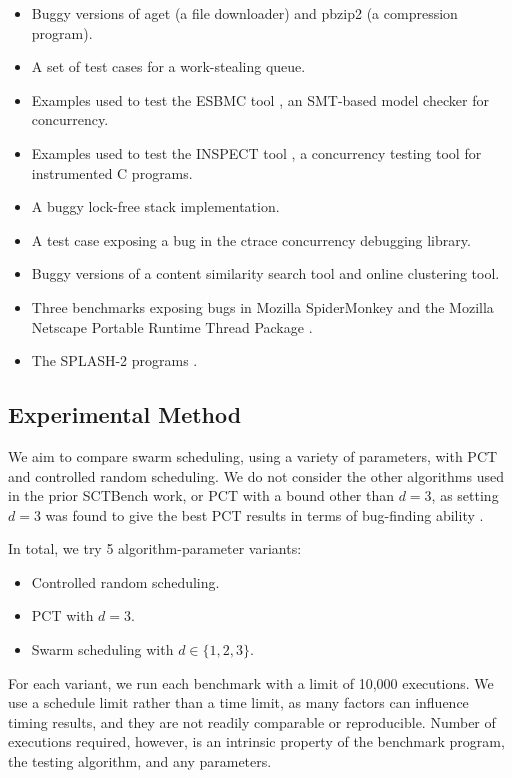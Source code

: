 \begin{itemize}
\item Buggy versions of aget (a file downloader) and pbzip2 (a compression
program).
\item A set of test cases for a work-stealing queue.
\item Examples used to test the ESBMC tool \parencite{cordeiro2011}, an SMT-based
model checker for concurrency.
\item Examples used to test the INSPECT tool \parencite{yang2008}, a concurrency
testing tool for instrumented C programs.
\item A buggy lock-free stack implementation.
\item A test case exposing a bug in the ctrace \parencite{mcpherson2003}
  concurrency debugging library.
\item Buggy versions of a content similarity search tool and online clustering
tool.
\item Three benchmarks exposing bugs in Mozilla
  SpiderMonkey \parencite{eich1996} and the Mozilla Net\-scape Portable
  Runtime Thread Package \parencite{mozilla1996}.
\item The SPLASH-2 programs \parencite{woo1995}.
\end{itemize}

\subsection{Experimental Method}
\label{sec:algorithms-bench-method}

We aim to compare swarm scheduling, using a variety of parameters, with PCT and
controlled random scheduling.  We do not consider the other algorithms used in
the prior SCTBench work, or PCT with a bound other than $d=3$, as setting $d=3$ was
found to give the best PCT results in terms of bug-finding ability \parencite{thomson2016}.

In total, we try 5 algorithm-parameter variants:

\begin{itemize}
\item Controlled random scheduling.
\item PCT with $d=3$.
\item Swarm scheduling with $d \in \{1,2,3\}$.
\end{itemize}

For each variant, we run each benchmark with a limit of 10,000
executions.  We use a schedule limit rather than a time limit, as many
factors can influence timing results, and they are not readily
comparable or reproducible.  Number of executions required, however,
is an intrinsic property of the benchmark program, the testing
algorithm, and any parameters.

